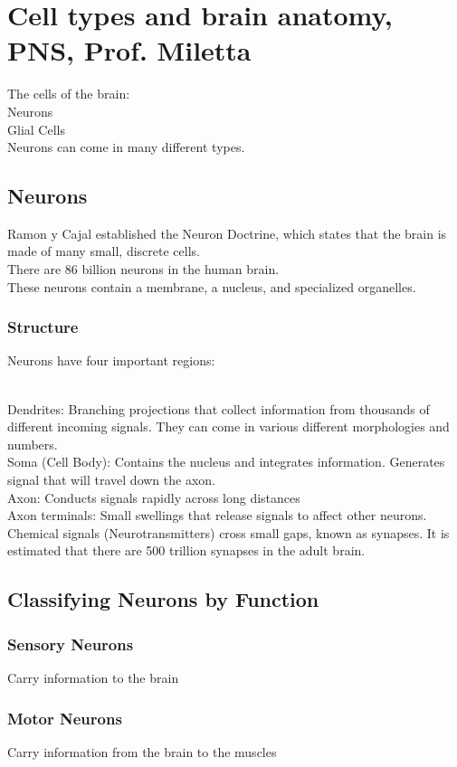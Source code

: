 \section{Cell types and brain anatomy, PNS, Prof. Miletta}
The cells of the brain:
\\Neurons
\\Glial Cells
\\Neurons can come in many different types.

\subsection{Neurons}
Ramon y Cajal established the Neuron Doctrine, which states that the brain is made of many small, discrete cells.
\\There are 86 billion neurons in the human brain.
\\These neurons contain a membrane, a nucleus, and specialized organelles.

\subsubsection{Structure}
Neurons have four important regions:

\\Dendrites: Branching projections that collect information from thousands of different incoming signals. They can come in various different morphologies and numbers.
\\Soma (Cell Body): Contains the nucleus and integrates information. Generates signal that will travel down the axon.
\\Axon: Conducts signals rapidly across long distances
\\Axon terminals: Small swellings that release signals to affect other neurons. Chemical signals (Neurotransmitters) cross small gaps, known as synapses. It is estimated that there are 500 trillion synapses in the adult brain.

\subsection{Classifying Neurons by Function}
\subsubsection{Sensory Neurons}
Carry information to the brain
\subsubsection{Motor Neurons}
Carry information from the brain to the muscles
